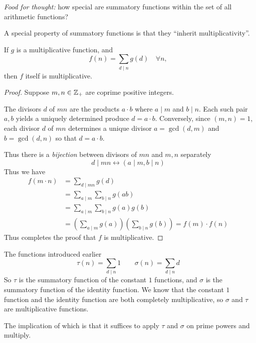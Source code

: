 \emph{Food for thought:} how special are summatory functions within the set of all arithmetic functions?

A special property of summatory functions is that they ``inherit multiplicativity''.
\begin{lemma}\label{lemma:summatory-preserves-multiplicativity}
    If $g$ is a multiplicative function, and \[f(n) = \sum_{d\mid n}g(d)\quad \forall n,\] then $f$ itself is multiplicative.
\end{lemma}

\begin{proof}
    Suppose $m, n\in \mathbb Z_+$ are coprime positive integers.

    The divisors $d$ of $mn$ are the products $a\cdot b$ where $a\mid m$ and $b\mid n$. Each such pair $a, b$ yields a uniquely determined produce $d = a\cdot b$. Conversely, since $(m, n) = 1$, each divisor $d$ of $mn$ determines a unique divisor $a=\gcd(d, m)$ and $b = \gcd(d, n)$ so that $d = a\cdot b$.

    Thus there is a \emph{bijection} between divisors of $mn$ and $m, n$ separately
    \[d\mid mn \longleftrightarrow (a\mid m, b\mid n)\]
    Thus we have
    \begin{align*}
        f(m\cdot n) & = \sum_{d\mid mn}g(d)                                              \\
                    & = \sum_{a\mid m}\sum_{b\mid n}g(ab)                                \\
                    & = \sum_{a\mid m}\sum_{b\mid n}g(a)g(b)                             \\
                    & = \left(\sum_{a\mid m} g(a)\right) \left(\sum_{b\mid n}g(b)\right)
        = f(m)\cdot f(n)
    \end{align*}
    Thus completes the proof that $f$ is multiplicative.
\end{proof}

\recall The functions introduced earlier
\[\tau(n) = \sum_{d\mid n} 1\qquad \sigma(n) = \sum_{d\mid n}d\]
So $\tau$ is the summatory function of the constant $1$ functions, and $\sigma$ is the summatory function of the identity function. We know that the constant $1$ function and the identity function are both completely multiplicative, so $\sigma$ and $\tau$ are multiplicative functions.

The implication of which is that it suffices to apply $\tau$ and $\sigma$ on prime powers and multiply.

